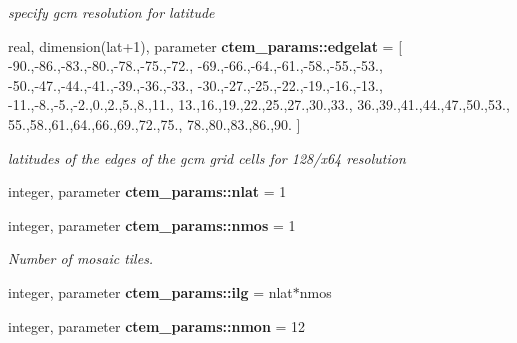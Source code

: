 \begin{DoxyCompactItemize}
\begin{DoxyCompactList}\small\item\em specify gcm resolution for latitude \end{DoxyCompactList}\item 
\hypertarget{namespacectem__params_ae540e0248a149a2d22fb9888a8cb113e}{}real, dimension(lat+1), parameter {\bfseries ctem\+\_\+params\+::edgelat} = \mbox{[} -\/90.,-\/86.,-\/83.,-\/80.,-\/78.,-\/75.,-\/72., -\/69.,-\/66.,-\/64.,-\/61.,-\/58.,-\/55.,-\/53., -\/50.,-\/47.,-\/44.,-\/41.,-\/39.,-\/36.,-\/33., -\/30.,-\/27.,-\/25.,-\/22.,-\/19.,-\/16.,-\/13., -\/11.,-\/8.,-\/5.,-\/2.,0.,2.,5.,8.,11., 13.,16.,19.,22.,25.,27.,30.,33., 36.,39.,41.,44.,47.,50.,53., 55.,58.,61.,64.,66.,69.,72.,75., 78.,80.,83.,86.,90. \mbox{]}\label{namespacectem__params_ae540e0248a149a2d22fb9888a8cb113e}

\begin{DoxyCompactList}\small\item\em latitudes of the edges of the gcm grid cells for 128/x64 resolution \end{DoxyCompactList}\item 
\hypertarget{namespacectem__params_aed4f6795fdebbed671839f1af3b98a9e}{}integer, parameter {\bfseries ctem\+\_\+params\+::nlat} = 1\label{namespacectem__params_aed4f6795fdebbed671839f1af3b98a9e}

\item 
\hypertarget{namespacectem__params_acc702cf69e445c30a2cf60576fdd86f2}{}integer, parameter {\bfseries ctem\+\_\+params\+::nmos} = 1\label{namespacectem__params_acc702cf69e445c30a2cf60576fdd86f2}

\begin{DoxyCompactList}\small\item\em Number of mosaic tiles. \end{DoxyCompactList}\item 
\hypertarget{namespacectem__params_a95fae29beaeaf9da9c112dbb76ab02db}{}integer, parameter {\bfseries ctem\+\_\+params\+::ilg} = nlat$\ast$nmos\label{namespacectem__params_a95fae29beaeaf9da9c112dbb76ab02db}

\item 
\hypertarget{namespacectem__params_a7d9aa770be284cd553a5356105ce73fb}{}integer, parameter {\bfseries ctem\+\_\+params\+::nmon} = 12\label{namespacectem__params_a7d9aa770be284cd553a5356105ce73fb}


\end{DoxyCompactItemize}
